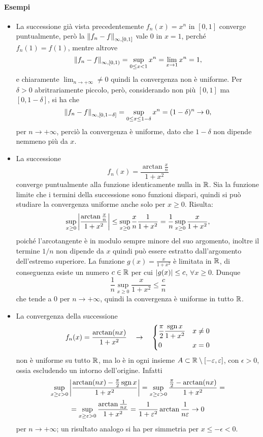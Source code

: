 \paragraph{Esempi}
\begin{itemize}
\item La successione già vista precedentemente $f_n(x)=x^n$ in $[0,1]$ converge puntualmente, però la $\left\|{f_n-f}\right\|_{\infty,[0,1]}$ vale 0 in $x=1$, perché $f_n(1)=f(1)$, mentre altrove
\[
\left\|{f_n-f}\right\|_{\infty,[0,1)}=\sup_{0\leq x<1} x^n=\lim_{x\to 1}x^n=1,
\]
e chiaramente $\lim_{n\to+\infty}\neq 0$ quindi la convergenza non è uniforme. Per $\delta>0$ abritrariamente piccolo, però, considerando non più $[0,1]$ ma $[0,1-\delta]$, si ha che 
\[
\left\|{f_n-f}\right\|_{\infty,[0,1-\delta]}=\sup_{0\leq x\leq 1-\delta} x^n=(1-\delta)^n\to 0,
\]
per $n\to+\infty$, perciò la convergenza è uniforme, dato che $1-\delta$ non dipende nemmeno più da $x$.
\item La successione
\[
f_n(x)=\frac{\arctan\frac{x}{n}}{1+x^2}
\]
converge puntualmente alla funzione identicamente nulla in $\mathbb{R}$. Sia la funzione limite che i termini della successione sono funzioni dispari, quindi si può studiare la convergenza uniforme anche solo per $x\geq 0$. Risulta:
\[
\sup_{x\geq 0}\left|{\frac{\arctan\frac{x}{n}}{1+x^2}}\right|\leq\sup_{x\geq 0}\frac{x}{n}\frac1{1+x^2}=\frac1{n}\sup_{x\geq 0}\frac{x}{1+x^2},
\]
poiché l'arcotangente è in modulo sempre minore del suo argomento, inoltre il termine $1/n$ non dipende da $x$ quindi può essere estratto dall'argomento dell'estremo superiore. La funzione $g(x)=\frac{x}{1+x^2}$ è limitata in $\mathbb{R}$, di conseguenza esiste un numero $c\in\mathbb{R}$ per cui $\left|{g(x)}\right|\leq c$, $\forall x\geq 0$. Dunque
\[
\frac1{n}\sup_{x\geq 0}\frac{x}{1+x^2}\leq\frac{c}{n}
\]
che tende a 0 per $n\to+\infty$, quindi la convergenza è uniforme in tutto $\mathbb{R}$.
\item La convergenza della successione
\[
f_n(x)=\frac{\arctan(nx)}{1+x^2}\quad\to\quad\begin{dcases}\frac{\pi}2\frac{\operatorname{sgn} x}{1+x^2}&x\neq 0\\ 0&x=0\end{dcases}
\]
non è uniforme su tutto $\mathbb{R}$, ma lo è in ogni insieme $A\subset\mathbb{R}\setminus[-\varepsilon,\varepsilon]$, con $\epsilon>0$, ossia escludendo un intorno dell'origine. Infatti
\begin{multline*}
\sup_{x\geq\varepsilon>0}\left|{\frac{\arctan(nx)-\frac{\pi}2\operatorname{sgn} x}{1+x^2}}\right|=\sup_{x\geq\varepsilon>0}\frac{\frac{\pi}2-\arctan(nx)}{1+x^2}=\\
=\sup_{x\geq\varepsilon>0}\frac{\arctan\frac1{nx}}{1+x^2}=\frac1{1+\varepsilon^2}\arctan\frac1{n\varepsilon}\to 0
\end{multline*}
per $n\to+\infty$; un risultato analogo si ha per simmetria per $x\leq -\epsilon<0$.
\end{itemize}
